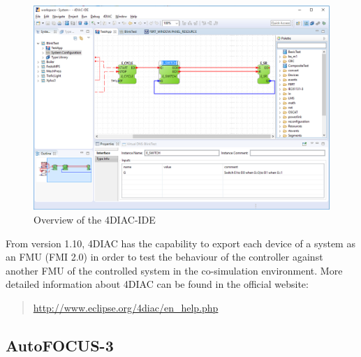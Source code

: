 %
\begin{figure}[hpt!]
  \centerline{\includegraphics[width=\textwidth]{figures/4diac-overview.png}}
  \caption{Overview of the 4DIAC-IDE}
  \label{figure:4diac-overview}
\end{figure}
%
%
From version 1.10, 4DIAC has the capability to export each device of a system as an FMU (FMI 2.0) in order to test the behaviour of the controller against another FMU of the controlled system in 
the co-simulation environment. More detailed information about 4DIAC can be found in the official website:
%
\begin{quote}
  \url{http://www.eclipse.org/4diac/en_help.php}
\end{quote} 
%
%
\subsection{AutoFOCUS-3}

